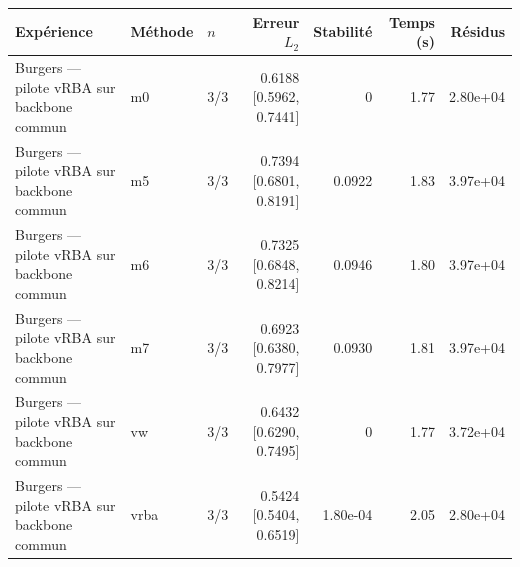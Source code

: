 \begin{tabular}{lllrrrr}
\toprule
Expérience & Méthode & $n$ & Erreur $L_2$ & Stabilité & Temps (s) & Résidus \\
\midrule
Burgers — pilote vRBA sur backbone commun & m0 & 3/3 & 0.6188 [0.5962, 0.7441] & 0 & 1.77 & 2.80e+04 \\
Burgers — pilote vRBA sur backbone commun & m5 & 3/3 & 0.7394 [0.6801, 0.8191] & 0.0922 & 1.83 & 3.97e+04 \\
Burgers — pilote vRBA sur backbone commun & m6 & 3/3 & 0.7325 [0.6848, 0.8214] & 0.0946 & 1.80 & 3.97e+04 \\
Burgers — pilote vRBA sur backbone commun & m7 & 3/3 & 0.6923 [0.6380, 0.7977] & 0.0930 & 1.81 & 3.97e+04 \\
Burgers — pilote vRBA sur backbone commun & vw & 3/3 & 0.6432 [0.6290, 0.7495] & 0 & 1.77 & 3.72e+04 \\
Burgers — pilote vRBA sur backbone commun & vrba & 3/3 & 0.5424 [0.5404, 0.6519] & 1.80e-04 & 2.05 & 2.80e+04 \\
\bottomrule
\end{tabular}
